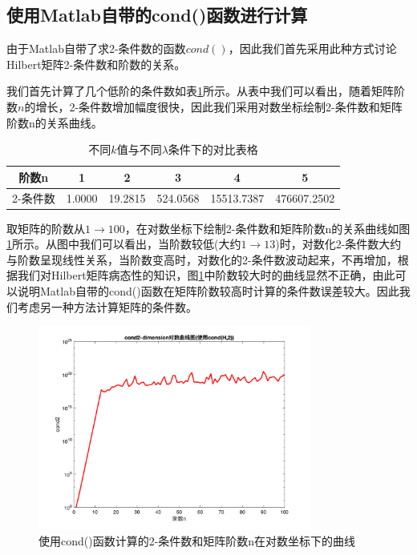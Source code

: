 \documentclass[a4paper]{article}
\begin{document}
\subsection{使用Matlab自带的cond()函数进行计算}
由于Matlab自带了求2-条件数的函数$cond()$，因此我们首先采用此种方式讨论Hilbert矩阵2-条件数和阶数的关系。

我们首先计算了几个低阶的条件数如表\ref{tab:table1}所示。从表中我们可以看出，随着矩阵阶数$n$的增长，2-条件数增加幅度很快，因此我们采用对数坐标绘制2-条件数和矩阵阶数n的关系曲线。

\begin{table}[htbp]
	\centering
	\caption{不同$k$值与不同$\lambda$条件下的对比表格}
	\label{tab:table1}
	\begin{tabular}{|c|c|c|c|c|c|}
		\hline
		阶数n & 1 & 2 & 3 & 4 & 5 \\
		\hline
		2-条件数 & 1.0000 & 19.2815 & 524.0568 & 15513.7387 & 476607.2502\\
		\hline
	\end{tabular}
\end{table}

取矩阵的阶数从$1\to100$，在对数坐标下绘制2-条件数和矩阵阶数n的关系曲线如图\ref{fig:1}所示。从图中我们可以看出，当阶数较低(大约$1\to 13$)时，对数化2-条件数大约与阶数呈现线性关系，当阶数变高时，对数化的2-条件数波动起来，不再增加，根据我们对Hilbert矩阵病态性的知识，图\ref{fig:1}中阶数较大时的曲线显然不正确，由此可以说明Matlab自带的cond()函数在矩阵阶数较高时计算的条件数误差较大。因此我们考虑另一种方法计算矩阵的条件数。

\begin{figure}[!h]
	\centering
	\includegraphics[width=0.8\textwidth]{../code/result/logcond2}
	\caption{\label{fig:1}使用cond()函数计算的2-条件数和矩阵阶数n在对数坐标下的曲线}
\end{figure}
\end{document}
